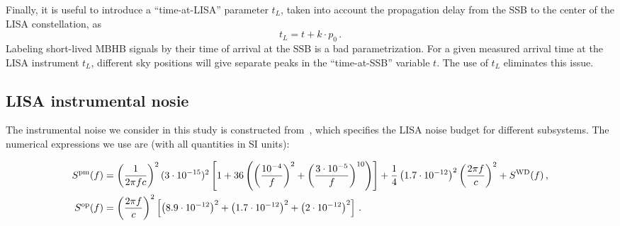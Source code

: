 \documentclass[aps,showpacs,twocolumn,prd,superscriptaddress,nofootinbib]{revtex4-1}
\newcommand{\be}{\begin{equation}}
\newcommand{\ee}{\end{equation}}
\newcommand{\bsub}{\begin{subequations}}
\newcommand{\esub}{\end{subequations}}
\newcommand{\Msol}{M_{\odot}}
\begin{document}
Finally, it is useful to introduce a ``time-at-LISA'' parameter $t_{L}$, taken into account the propagation delay from the SSB to the center of the LISA constellation, as
\be\label{eq:deftL}
	t_{L} = t + k\cdot p_{0} \,.
\ee
Labeling short-lived MBHB signals by their time of arrival at the SSB is a bad parametrization. For a given measured arrival time at the LISA instrument $t_{L}$, different sky positions will give separate peaks in the ``time-at-SSB'' variable $t$. The use of $t_{L}$ eliminates this issue.


\subsection{LISA instrumental nosie}
\label{app:LISAnoise}

The instrumental noise we consider in this study is constructed from~\cite{LISANoiseBudget16}, which specifies the LISA noise budget for different subsystems. The numerical expressions we use are (with all quantities in SI units):
\begin{widetext}
\bsub
\begin{align}
	S^{\rm pm} (f) &= \left(\frac{1}{2\pi f c}\right)^{2} (3\cdot 10^{-15})^{2} \left[1 + 36 \left( \left(\frac{10^{-4}}{f}\right)^{2} + \left(\frac{3\cdot10^{-5}}{f}\right)^{10} \right)\right] + \frac{1}{4}\left(1.7\cdot 10^{-12}\right)^{2} \left(\frac{2\pi f}{c}\right)^{2} + S^{\rm WD}(f) \,,\\
	S^{\rm op} (f) &= \left(\frac{2\pi f}{c}\right)^{2} \left[\left(8.9\cdot 10^{-12}\right)^{2} + \left(1.7\cdot 10^{-12}\right)^{2} + \left(2\cdot 10^{-12}\right)^{2}\right] \,.
\end{align}
\esub
\end{widetext}


%


%
%
\end{document}
